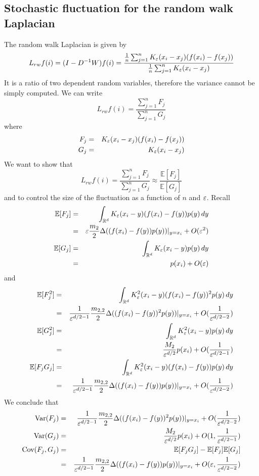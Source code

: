 \subsection{Stochastic fluctuation for the random walk Laplacian}
The random walk Laplacian is given by
$$L_{rw}f(i) = (I - D^{-1}W)f(i) = \frac{\frac{1}{n}\sum_{j=1}^n K_{\varepsilon}(x_i-x_j) (f(x_i)-f(x_j))}{\frac{1}{n}\sum_{j=1}^n K_{\varepsilon}(x_i-x_j)}$$
It is a ratio of two dependent random variables, therefore the variance cannot be simply computed. We can write
$$L_{rw}f(i) = \frac{\sum_{j=1}^n F_j}{\sum_{j=1}^n G_j}$$
where
\begin{eqnarray*}
F_j &=& K_{\varepsilon}(x_i-x_j) (f(x_i)-f(x_j))\\
G_j &=& K_{\varepsilon}(x_i-x_j)
\end{eqnarray*}
We want to show that
$$L_{rw}f(i) = \frac{\sum_{j=1}^n F_j}{\sum_{j=1}^n G_j} \approx \frac{\mathbb{E}[F_j]}{\mathbb{E}[G_j]}$$
and to control the size of the fluctuation as a function of $n$ and $\varepsilon$.
Recall
\begin{eqnarray*}
\mathbb{E}[F_j] &=& \int_{\mathbb{R}^d} K_{\varepsilon}(x_i-y) (f(x_i)-f(y))p(y)\,dy \\ &=& \varepsilon \frac{m_2}{2}\Delta ((f(x_i)-f(y))p(y))|_{y=x_i} + O(\varepsilon^2) \\
\mathbb{E}[G_j] &=& \int_{\mathbb{R}^d} K_{\varepsilon}(x_i-y) p(y)\,dy \\ &=& p(x_i) + O(\varepsilon)
\end{eqnarray*}
and
\begin{eqnarray*}
\mathbb{E}[F_j^2] &=& \int_{\mathbb{R}^d} K_{\varepsilon}^2(x_i-y) (f(x_i)-f(y))^2 p(y)\,dy \\
&=& \frac{1}{\varepsilon^{d/2-1}} \frac{m_{2,2}}{2}\Delta ((f(x_i)-f(y))^2p(y))|_{y=x_i} + O(\frac{1}{\varepsilon^{d/2-2}}) \\
\mathbb{E}[G_j^2] &=& \int_{\mathbb{R}^d} K_{\varepsilon}^2(x_i-y) p(y)\,dy \\
&=& \frac{M_2}{\varepsilon^{d/2}}p(x_i) + O(\frac{1}{\varepsilon^{d/2-1}}) \\
\mathbb{E}[F_j G_j] &=& \int_{\mathbb{R}^d} K_{\varepsilon}^2(x_i-y) (f(x_i)-f(y))p(y)\,dy \\
&=& \frac{1}{\varepsilon^{d/2-1}} \frac{m_{2,2}}{2}\Delta ((f(x_i)-f(y))p(y))|_{y=x_i} + O(\frac{1}{\varepsilon^{d/2-2}})
\end{eqnarray*}
We conclude that
\begin{eqnarray*}
\text{Var}(F_j) &=& \frac{1}{\varepsilon^{d/2-1}} \frac{m_{2,2}}{2}\Delta ((f(x_i)-f(y))^2p(y))|_{y=x_i} + O(\frac{1}{\varepsilon^{d/2-2}}) \\
\text{Var}(G_j) &=& \frac{M_2}{\varepsilon^{d/2}}p(x_i) + O(1,\frac{1}{\varepsilon^{d/2-1}}) \\
\text{Cov}(F_j, G_j) &=& \mathbb{E}[F_j G_j] - \mathbb{E}[F_j]\mathbb{E}[G_j] \\
&=& \frac{1}{\varepsilon^{d/2-1}} \frac{m_{2,2}}{2}\Delta ((f(x_i)-f(y))p(y))|_{y=x_i} + O(\varepsilon,\frac{1}{\varepsilon^{d/2-2}})
\end{eqnarray*}
